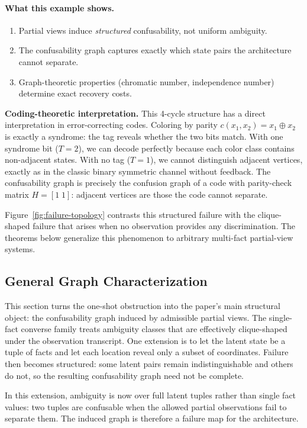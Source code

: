 \paragraph{What this example shows.}
\begin{enumerate}
\item Partial views induce \emph{structured} confusability, not uniform ambiguity.
\item The confusability graph captures exactly which state pairs the architecture cannot separate.
\item Graph-theoretic properties (chromatic number, independence number) determine exact recovery costs.
\end{enumerate}

\noindent\textbf{Coding-theoretic interpretation.} This 4-cycle structure has a direct interpretation in error-correcting codes. Coloring by parity $c(x_1,x_2) = x_1 \oplus x_2$ is exactly a syndrome: the tag reveals whether the two bits match. With one syndrome bit ($T=2$), we can decode perfectly because each color class contains non-adjacent states. With no tag ($T=1$), we cannot distinguish adjacent vertices, exactly as in the classic binary symmetric channel without feedback. The confusability graph is precisely the confusion graph of a code with parity-check matrix $H = [1\; 1]$: adjacent vertices are those the code cannot separate.

Figure~\ref{fig:failure-topology} contrasts this structured failure with the clique-shaped failure that arises when no observation provides any discrimination. The theorems below generalize this phenomenon to arbitrary multi-fact partial-view systems.

\subsection{General Graph Characterization}

This section turns the one-shot obstruction into the paper's main structural object: the confusability graph induced by admissible partial views. The single-fact converse family treats ambiguity classes that are effectively clique-shaped under the observation transcript. One extension is to let the latent state be a tuple of facts and let each location reveal only a subset of coordinates. Failure then becomes structured: some latent pairs remain indistinguishable and others do not, so the resulting confusability graph need not be complete.

In this extension, ambiguity is now over full latent tuples rather than single fact values: two tuples are confusable when the allowed partial observations fail to separate them. The induced graph is therefore a failure map for the architecture.

